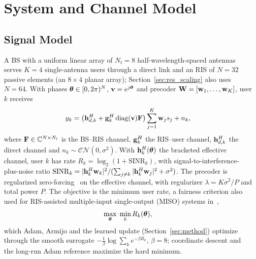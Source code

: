 \section{System and Channel Model}
\label{sec:system}

\subsection{Signal Model}
A BS with a uniform linear array of $N_t=8$ half-wavelength-spaced antennas serves $K=4$ single-antenna users through a direct link and an RIS of $N=32$ passive elements (an $8\times 4$ planar array); Section~\ref{sec:res_scaling} also uses $N=64$. With phases $\boldsymbol{\theta}\in[0,2\pi)^N$, $\mathbf{v}=e^{j\boldsymbol{\theta}}$ and precoder $\mathbf{W}=[\mathbf{w}_1,\dots,\mathbf{w}_K]$, user $k$ receives
\begin{equation}
    y_k = \left(\mathbf{h}_{d,k}^H + \mathbf{g}_k^H \operatorname{diag}(\mathbf{v})\mathbf{F}\right)\sum_{j=1}^K \mathbf{w}_j s_j + n_k ,
    \label{eq:signal}
\end{equation}
where $\mathbf{F}\in\mathbb{C}^{N\times N_t}$ is the BS--RIS channel, $\mathbf{g}_k^H$ the RIS--user channel, $\mathbf{h}_{d,k}^H$ the direct channel and $n_k\sim\mathcal{CN}(0,\sigma^2)$. With $\mathbf{h}_k^H(\boldsymbol{\theta})$ the bracketed effective channel, user $k$ has rate $R_k=\log_2(1+\mathrm{SINR}_k)$, with signal-to-interference-plus-noise ratio $\mathrm{SINR}_k = |\mathbf{h}_k^H \mathbf{w}_k|^2/(\sum_{j\ne k}|\mathbf{h}_k^H \mathbf{w}_j|^2 + \sigma^2)$. The precoder is regularized zero-forcing~\cite{Peel2005TCOM} on the effective channel, with regularizer $\lambda = K\sigma^2/P$ and total power $P$. The objective is the minimum user rate, a fairness criterion also used for RIS-assisted multiple-input single-output (MISO) systems in~\cite{Nadeem2020TWC},
\begin{equation}
    \max_{\boldsymbol{\theta}} \; \min_k R_k(\boldsymbol{\theta}),
    \label{eq:maxmin}
\end{equation}
which Adam, Armijo and the learned update (Section~\ref{sec:method}) optimize through the smooth surrogate $-\tfrac{1}{\beta}\log\sum_k e^{-\beta R_k}$, $\beta=8$; coordinate descent and the long-run Adam reference maximize the hard minimum.

